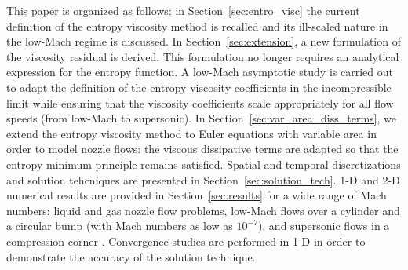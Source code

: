 \documentclass[preprint,10pt]{elsarticle}
\renewcommand{\div}{\vec{\nabla}\! \cdot \!}
\newcommand{\grad}{\vec{\nabla}}
\newcommand{\eqt}[1]{Eq.~(\ref{#1})}                     %
\newcommand{\sct}[1]{Section~\ref{#1}}                   %
\newcommand{\tcr}[1]{\textcolor{red}{#1}}
\begin{document}
This paper is organized as follows: in \sct{sec:entro_visc} the current definition of the entropy viscosity method is recalled and 
its ill-scaled nature in the low-Mach regime is discussed. 
In \sct{sec:extension}, a new formulation of the viscosity residual is derived. This formulation no longer requires an analytical expression 
for the entropy function. A low-Mach asymptotic study is carried out to adapt the definition of the entropy viscosity coefficients 
in the incompressible limit while ensuring that the viscosity coefficients scale appropriately for all flow speeds (from low-Mach to supersonic).
%
In  \sct{sec:var_area_diss_terms}, we extend the entropy viscosity method to Euler equations with variable area in order to model nozzle flows: 
the viscous dissipative terms are adapted so that the entropy minimum principle remains satisfied.
Spatial and temporal discretizations and solution tehcniques are presented in \sct{sec:solution_tech}.
 1-D and 2-D numerical results 
are provided in \sct{sec:results} for a wide range of Mach numbers: liquid and gas nozzle flow problems, 
low-Mach flows over a cylinder and a circular bump (with Mach numbers as low as $10^{-7}$), and supersonic flows 
in a compression corner \cite{CompressionCorner}. 
Convergence studies are performed in 1-D in order to demonstrate the accuracy of the solution technique. 


\end{document}
